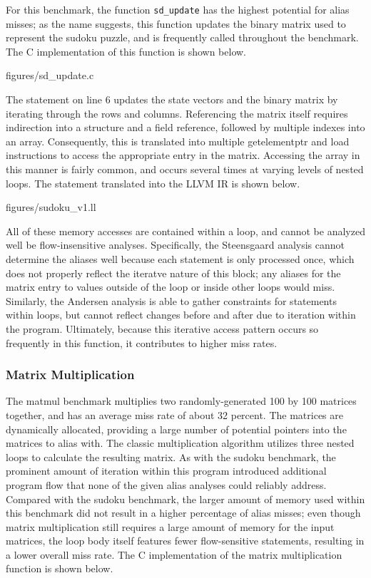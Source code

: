 For this benchmark, the function \texttt{sd\_update} has the highest potential for alias misses; as the name suggests, this function updates the binary matrix used to represent the sudoku puzzle, and is frequently called throughout the benchmark. The C implementation of this function is shown below.

 {figures/sd_update.c}

The statement on line 6 updates the state vectors and the binary matrix by iterating through the rows and columns. Referencing the matrix itself requires indirection into a structure and a field reference, followed by multiple indexes into an array. Consequently, this is translated into multiple getelementptr and load instructions to access the appropriate entry in the matrix. Accessing the array in this manner is fairly common, and occurs several times at varying levels of nested loops. The statement translated into the LLVM IR is shown below.

 {figures/sudoku_v1.ll}

All of these memory accesses are contained within a loop, and cannot be analyzed well be flow-insensitive analyses. Specifically, the Steensgaard analysis cannot determine the aliases well because each statement is only processed once, which does not properly reflect the iteratve nature of this block; any aliases for the matrix entry to values outside of the loop or inside other loops would miss. Similarly, the Andersen analysis is able to gather constraints for statements within loops, but cannot reflect changes before and after due to iteration within the program. Ultimately, because this iterative access pattern occurs so frequently in this function, it contributes to higher miss rates.

\subsubsection{Matrix Multiplication}
The matmul benchmark multiplies two randomly-generated 100 by 100 matrices together, and has an average miss rate of about 32 percent. The matrices are dynamically allocated, providing a large number of potential pointers into the matrices to alias with. The classic multiplication algorithm utilizes three nested loops to calculate the resulting matrix. As with the sudoku benchmark, the prominent amount of iteration within this program introduced additional program flow that none of the given alias analyses could reliably address. Compared with the sudoku benchmark, the larger amount of memory used within this benchmark did not result in a higher percentage of alias misses; even though matrix multiplication still requires a large amount of memory for the input matrices, the loop body itself features fewer flow-sensitive statements, resulting in a lower overall miss rate. The C implementation of the matrix multiplication function is shown below.

